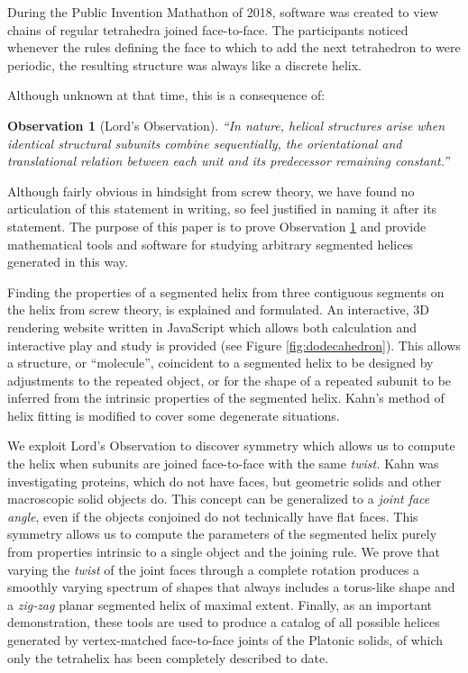 \documentclass[11pt]{article}
\newtheorem{observation}{Observation}
\begin{document}
{During the Public Invention Mathathon of 2018\cite{read2019mathathon}, software was
created to view chains of regular tetrahedra joined face-to-face.
The participants noticed whenever the rules
defining the face to which to add the next
tetrahedron
to were periodic, the resulting
structure was always like a discrete helix.

Although unknown at that time, this is a consequence of:
\begin{observation}[Lord's Observation]
  “In nature, helical structures arise when identical structural subunits combine sequentially, the orientational and translational relation between each unit and its predecessor remaining constant.”\cite{lord2002helical}
  \label{obs:lord}
\end{observation}
Although fairly obvious in hindsight from screw theory, we have found no articulation of this statement
in writing, so feel justified in naming it after its statement.
The purpose of this paper is to prove Observation \ref{obs:lord} and provide mathematical
tools and software for studying arbitrary
segmented helices generated in this way.

Finding the properties of a segmented helix from three contiguous segments on the helix from screw theory\cite{abbasi2015review,wittenburg2016kinematics,wiki:screwaxis,kahn1989defining},
is explained and formulated.
An interactive, 3D rendering website written in JavaScript which allows both calculation and
interactive play and study is provided\cite{segmentedhelixinteractive}
(see Figure \ref{fig:dodecahedron}). This allows
a structure, or ``molecule'', coincident to a segmented helix to be designed
by adjustments to the repeated object, or for the shape of
a repeated subunit to be inferred from the intrinsic properties of the
segmented helix.
Kahn's method of helix fitting\cite{kahn1989defining} is modified to cover some degenerate situations.

We exploit Lord's Observation to discover symmetry which allows us to compute the helix when subunits are joined face-to-face with
the same {\em twist.} Kahn was investigating proteins, which do not have faces, but geometric solids and other macroscopic solid objects do.
This concept can be generalized to a {\em joint face angle}, even if the
objects conjoined do not technically have flat faces.
This symmetry allows us to compute the parameters of the segmented helix purely from
properties intrinsic to a single object and the joining rule.
We prove that varying the {\em twist} of the joint faces through a complete rotation produces a smoothly varying
spectrum of shapes that always includes a torus-like shape and a
{\em zig-zag} planar segmented helix of maximal extent.
Finally, as an important demonstration, these tools are used to produce
a catalog of all possible helices generated by vertex-matched face-to-face joints of the
Platonic solids, of which only the tetrahelix\cite{coxeter1985simplicial,sadler2013periodic,fuller1982synergetics,read2018transforming,pearce1990structure}
has been completely described to date.

}
\end{document}
